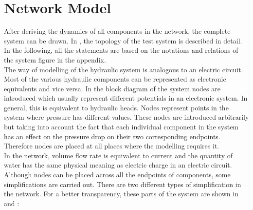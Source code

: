 \section{Network Model}  
\label{SystemModel}

After deriving the dynamics of all components in the network, the complete system can be drawn. In , the topology of the test system is described in detail. In the following, all the statements are based on the notations and relations of the system figure in the appendix. 
\\
The way of modelling of the hydraulic system is analogous to an electric circuit. Most of the various hydraulic components can be represented as electronic equivalents and vice versa. In the block diagram of the system nodes are introduced which usually represent different potentials in an electronic system. In general, this is equivalent to hydraulic heads. Nodes represent points in the system where pressure has different values. These nodes are introduced arbitrarily but taking into account the fact that each individual component in the system has an effect on the pressure drop on their two corresponding endpoints. Therefore nodes are placed at all places where the modelling requires it. 
\\
In the network, volume flow rate is equivalent to current and the quantity of water has the same physical meaning as electric charge in an electric circuit. 
\\ 
Although nodes can be placed across all the endpoints of components, some simplifications are carried out. There are two different types of simplification in the network. For a better transparency, these parts of the system are shown in  and : 


\begin{figure}[H]
\centering
\begin{minipage}{0.2\textwidth}
  \centering
   
  \label{fig:subsys_1}
\end{minipage}%
\begin{minipage}{0.2\textwidth}
  \centering
   
  \label{fig:subsys_2}
\end{minipage}
\end{figure}

